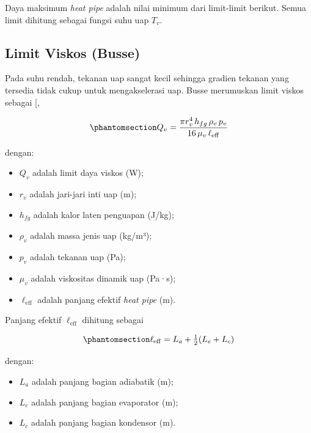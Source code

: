 \documentclass[
  indonesian,
  12pt,
  a4paper,
]{report}
\providecommand{\tightlist}{%
  \setlength{\itemsep}{0pt}\setlength{\parskip}{0pt}}
\begin{document}
Daya maksimum \emph{heat pipe} adalah nilai minimum dari limit-limit
berikut. Semua limit dihitung sebagai fungsi suhu uap \(T_v\).

\subsection{Limit Viskos (Busse)}\label{limit-viskos-busse}

Pada suhu rendah, tekanan uap sangat kecil sehingga gradien tekanan yang
tersedia tidak cukup untuk mengakselerasi uap. Busse merumuskan limit
viskos sebagai {[},
\citeproc{ref-busse1973}{28}{]}

\begin{equation}\protect\phantomsection\label{eq-viscous}{ Q_v = \frac{\pi r_v^4\,h_{fg}\,\rho_v\,p_v}
              {16\,\mu_v\,\ell_{\mathrm{eff}}} }\end{equation}

dengan:

\begin{itemize}
\tightlist
\item
  \(Q_v\) adalah limit daya viskos (W);
\item
  \(r_v\) adalah jari-jari inti uap (m);
\item
  \(h_{fg}\) adalah kalor laten penguapan (J/kg);
\item
  \(\rho_v\) adalah massa jenis uap (kg/m³);
\item
  \(p_v\) adalah tekanan uap (Pa);
\item
  \(\mu_v\) adalah viskositas dinamik uap (Pa·s);
\item
  \(\ell_{\mathrm{eff}}\) adalah panjang efektif \emph{heat pipe} (m).
\end{itemize}

Panjang efektif \(\ell_{\mathrm{eff}}\) dihitung sebagai

\begin{equation}\protect\phantomsection\label{eq-leff}{ \ell_{\mathrm{eff}} = L_a + \tfrac{1}{2}(L_e+L_c) }\end{equation}

dengan:

\begin{itemize}
\tightlist
\item
  \(L_a\) adalah panjang bagian adiabatik (m);
\item
  \(L_e\) adalah panjang bagian evaporator (m);
\item
  \(L_c\) adalah panjang bagian kondensor (m).
\end{itemize}
\end{document}
